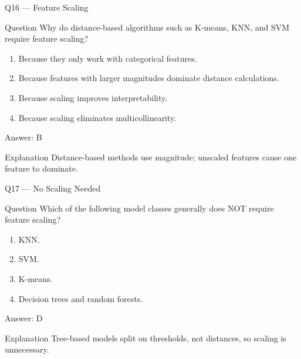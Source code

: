 \documentclass[aspectratio=169,8pt]{beamer}
\begin{document}
	\begin{frame}{Q16 --- Feature Scaling}
		\begin{block}{Question}
			Why do distance-based algorithms such as K-means, KNN, and SVM require feature scaling?
		\end{block}
		\begin{enumerate}
			\item Because they only work with categorical features.
			\item Because features with larger magnitudes dominate distance calculations.
			\item Because scaling improves interpretability.
			\item Because scaling eliminates multicollinearity.
		\end{enumerate}
		\begin{exampleblock}{Answer: B}\end{exampleblock}
		\begin{block}{Explanation}
			Distance-based methods use magnitude; unscaled features cause one feature to dominate.
		\end{block}
	\end{frame}
	
	\begin{frame}{Q17 --- No Scaling Needed}
		\begin{block}{Question}
			Which of the following model classes generally does NOT require feature scaling?
		\end{block}
		\begin{enumerate}
			\item KNN.
			\item SVM.
			\item K-means.
			\item Decision trees and random forests.
		\end{enumerate}
		\begin{exampleblock}{Answer: D}\end{exampleblock}
		\begin{block}{Explanation}
			Tree-based models split on thresholds, not distances, so scaling is unnecessary.
		\end{block}
	\end{frame}
	
\end{document}
